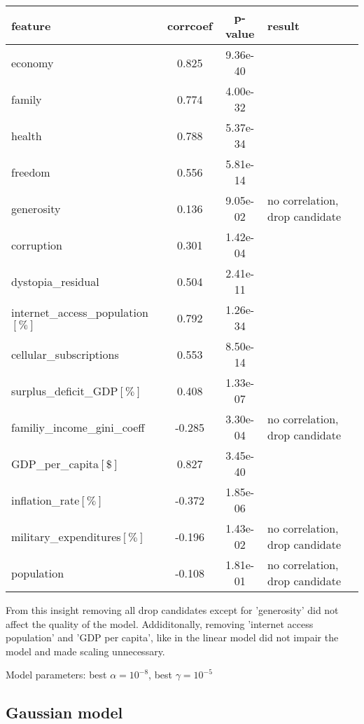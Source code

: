 \documentclass[11pt]{article}
\begin{document}
\begin{tabular}{|l|c|c|l|}
\hline
feature & corrcoef & p-value & result\\
\hline
economy                       & 0.825 & 9.36e-40 &\\
family                        & 0.774 & 4.00e-32 &\\
health                        & 0.788 & 5.37e-34 &\\
freedom                       & 0.556 & 5.81e-14 &\\
generosity                    & 0.136 & 9.05e-02 & no correlation, drop candidate\\
corruption                    & 0.301 & 1.42e-04 &\\
dystopia\_residual             & 0.504 & 2.41e-11 &\\
internet\_access\_population$\left[\%\right]$ & 0.792 & 1.26e-34 &\\
cellular\_subscriptions        & 0.553 & 8.50e-14 &\\
surplus\_deficit\_GDP$\left[\%\right]$        & 0.408 & 1.33e-07 &\\
familiy\_income\_gini\_coeff     & -0.285 & 3.30e-04 & no correlation, drop candidate\\
GDP\_per\_capita$\left[\$\right]$             & 0.827 & 3.45e-40 &\\
inflation\_rate$\left[\%\right]$             & -0.372 & 1.85e-06 &\\
military\_expenditures$\left[\%\right]$      & -0.196 & 1.43e-02 & no correlation, drop candidate\\
population                    & -0.108 & 1.81e-01 & no correlation, drop candidate\\
\hline
\end{tabular}

\hspace{.4cm}

From this insight removing all drop candidates except for 'generosity'
did not affect the quality of the model. Addiditonally, removing
'internet access population' and 'GDP per capita', like in the linear
model did not impair the model and made scaling unnecessary.\newline

Model parameters: best \(\alpha = 10^{-8}\), best \(\gamma = 10^{-5}\)

    \subsection{Gaussian model}\label{gaussian-model}
\end{document}
